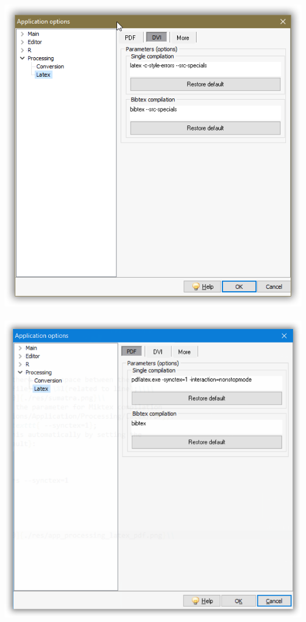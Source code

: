 \includegraphics[scale=0.40]{./res/app_processing_latex_dvi.png}~~
\includegraphics[scale=0.40]{./res/app_processing_latex_pdf.png}\\
